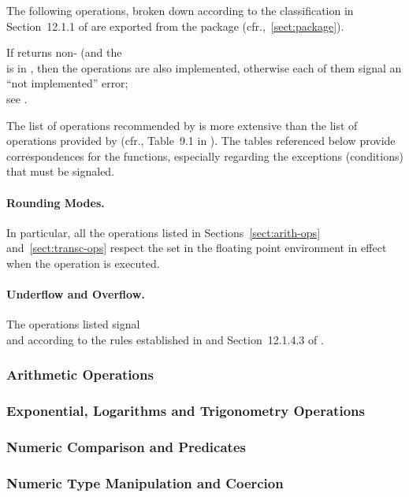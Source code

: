 \documentclass[../Floating-Point-Operations.tex]{subfiles}
\begin{document}
The following \CL{} operations, broken down according to the
classification in Section~12.1.1 of \cite{1996:ANSIHyperSpec} are exported
from the \CLLIAPKG{} package
(cfr.,~\ref{sect:package}).

If  returns non-
(and the\\
 is in
, then the operations are also implemented, otherwise
each of them signal an ``not implemented'' error;\\
see .

The list of operations
recommended by \cite{2008:IEEE-754} is more extensive than the list of
operations provided by \CL{} (cfr., Table~9.1 in \cite{2008:IEEE-754}).
%
The tables referenced below provide correspondences for the \CL{} functions,
especially regarding the exceptions (conditions) that must be
signaled.

\paragraph{Rounding Modes.} In particular, all the operations listed
in Sections~\ref{sect:arith-ops} and~\ref{sect:transc-ops} respect the
 set in the floating point
environment in effect when the operation is executed.

\paragraph{Underflow and Overflow.}  The operations listed signal
\\ and
 according to the rules established
in \cite{2008:IEEE-754} and Section~12.1.4.3 of \cite{1996:ANSIHyperSpec}.


\subsubsection{Arithmetic Operations}

\newpage

\subsubsection{Exponential, Logarithms and Trigonometry Operations}

\newpage

\subsubsection{Numeric Comparison and Predicates}


\subsubsection{Numeric Type Manipulation and Coercion}

\end{document}
